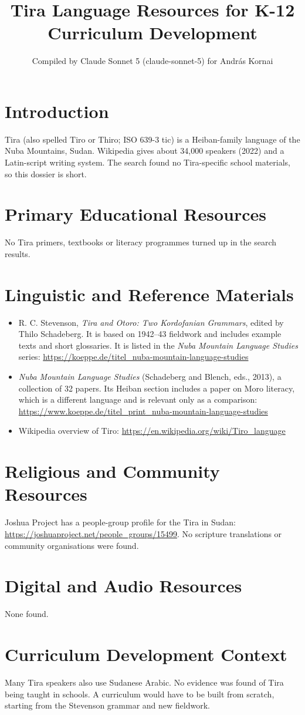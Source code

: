 \documentclass[12pt]{article}
\title{Tira Language Resources for K-12 Curriculum Development}
\author{Compiled by Claude Sonnet 5 (claude-sonnet-5) for Andr\'as Kornai}
\date{}
\begin{document}
\maketitle
\section{Introduction}
Tira (also spelled Tiro or Thiro; ISO 639-3 tic) is a Heiban-family language of the Nuba Mountains, Sudan. Wikipedia gives about 34,000 speakers (2022) and a Latin-script writing system. The search found no Tira-specific school materials, so this dossier is short.
\section{Primary Educational Resources}
No Tira primers, textbooks or literacy programmes turned up in the search results.
\section{Linguistic and Reference Materials}
\begin{itemize}
\item R. C. Stevenson, \emph{Tira and Otoro: Two Kordofanian Grammars}, edited by Thilo Schadeberg. It is based on 1942--43 fieldwork and includes example texts and short glossaries. It is listed in the \emph{Nuba Mountain Language Studies} series: \url{https://koeppe.de/titel_nuba-mountain-language-studies}
\item \emph{Nuba Mountain Language Studies} (Schadeberg and Blench, eds., 2013), a collection of 32 papers. Its Heiban section includes a paper on Moro literacy, which is a different language and is relevant only as a comparison: \url{https://www.koeppe.de/titel_print_nuba-mountain-language-studies}
\item Wikipedia overview of Tiro: \url{https://en.wikipedia.org/wiki/Tiro_language}
\end{itemize}
\section{Religious and Community Resources}
Joshua Project has a people-group profile for the Tira in Sudan: \url{https://joshuaproject.net/people_groups/15499}. No scripture translations or community organisations were found.
\section{Digital and Audio Resources}
None found.
\section{Curriculum Development Context}
Many Tira speakers also use Sudanese Arabic. No evidence was found of Tira being taught in schools. A curriculum would have to be built from scratch, starting from the Stevenson grammar and new fieldwork.
\end{document}

